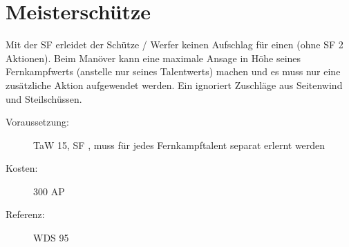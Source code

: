 \section{Meisterschütze}
\label{sf.meisterschuetze}
Mit der SF  erleidet der Schütze / Werfer keinen Aufschlag für einen  (ohne SF 2 Aktionen).
Beim Manöver  kann eine maximale Ansage in Höhe seines Fernkampfwerts (anstelle nur seines Talentwerts) machen und es muss nur eine zusätzliche Aktion aufgewendet werden.
Ein  ignoriert Zuschläge aus Seitenwind und Steilschüssen.
\begin{description}
    \item[Voraussetzung:]
        TaW  15, SF , muss für jedes Fernkampftalent separat erlernt werden
    \item [Kosten:]
        300 AP
    \item [Referenz:]
        WDS 95
\end{description}
